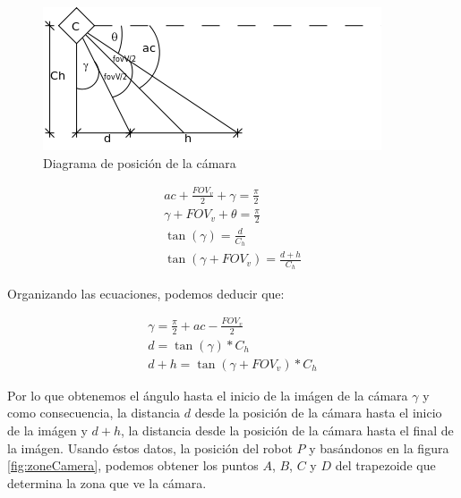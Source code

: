 \begin{figure}[htp]
\begin{center}
\includegraphics{comportamientos/angleCamera.png}
\caption{Diagrama de posici\'on de la c\'amara}
\label{fig:angleCamera}
\end{center}
\end{figure}

\begin{eqnarray}
ac + \frac{FOV_v}{2} + \gamma = \frac{\pi}{2}\\
\gamma + FOV_v + \theta = \frac{\pi}{2}\\
\tan(\gamma) = \frac{d}{C_h}\\
\tan(\gamma+FOV_v) = \frac{d+h}{C_h}
\end{eqnarray}

Organizando las ecuaciones, podemos deducir que:

\begin{eqnarray}
\gamma = \frac{\pi}{2} + ac - \frac{FOV_v}{2}\\
\label{eqn:distance_d}
d = \tan(\gamma) * C_h \\
\label{eqn:distance_dh}
d+h = \tan(\gamma+FOV_v) * C_h
\end{eqnarray}

Por lo que obtenemos el \'angulo hasta el inicio de la im\'agen de la c\'amara $\gamma$ y como consecuencia,
la distancia $d$ desde la posici\'on de la c\'amara hasta el inicio de la im\'agen y $d+h$,
la distancia desde la posici\'on de la c\'amara hasta el final de la im\'agen. Usando \'estos
datos, la posici\'on del robot $P$ y bas\'andonos en la figura \ref{fig:zoneCamera}, podemos obtener
los puntos $A$, $B$, $C$ y $D$ del trapezoide que determina la zona que ve la c\'amara.

